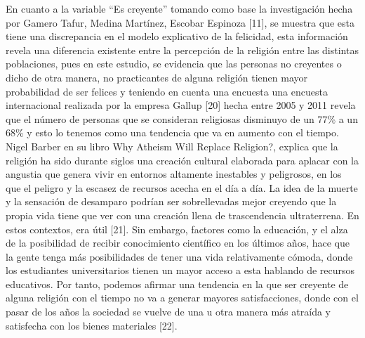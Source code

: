 \documentclass[conference]{IEEEtran}
\begin{document}
   En cuanto a la variable “Es creyente”  tomando como base la investigación hecha por Gamero Tafur, Medina Martínez, Escobar Espinoza [11], se muestra que esta tiene una discrepancia en el modelo explicativo de la felicidad, esta información revela una  diferencia existente entre la percepción de la religión entre las  distintas poblaciones, pues en este estudio, se evidencia que las personas no creyentes o dicho de otra manera, no practicantes de alguna religión tienen mayor probabilidad de ser felices y teniendo en cuenta una encuesta una encuesta internacional realizada por la empresa Gallup [20] hecha entre 2005 y 2011 revela que el número de personas que se consideran religiosas disminuyo de un 77\% a un 68\% y esto lo tenemos como una tendencia que va en aumento con el tiempo. Nigel Barber en su libro Why Atheism Will Replace Religion?, explica que la religión ha sido durante siglos una creación cultural elaborada para aplacar con la angustia que genera vivir en entornos altamente inestables y peligrosos, en los que el peligro y la escasez de recursos acecha en el día a día. La idea de la muerte y la sensación de desamparo podrían ser sobrellevadas mejor creyendo que la propia vida tiene que ver con una creación llena de trascendencia ultraterrena. En estos contextos, era útil [21]. Sin embargo, factores como la educación, y el alza de la posibilidad de recibir conocimiento científico en los últimos años, hace que la gente tenga más posibilidades de tener una vida relativamente cómoda, donde los estudiantes universitarios tienen un mayor acceso a esta hablando de recursos educativos. Por tanto, podemos afirmar una tendencia en la que ser creyente de alguna religión con el tiempo no va a generar mayores satisfacciones, donde con el pasar de los años la sociedad se vuelve de una u otra manera más atraída y satisfecha con los bienes materiales [22].\\
\end{document}
